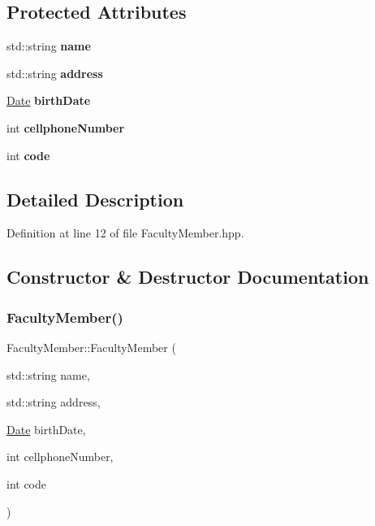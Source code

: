 \subsection*{Protected Attributes}
\begin{DoxyCompactItemize}
\item 
\mbox{\label{classFacultyMember_a1db0d896f97f2ef4e38aa84bf6720f9e}} 
std\+::string {\bfseries name}
\item 
\mbox{\label{classFacultyMember_adaecb566a4413d65f3ff4b9ba0048fc7}} 
std\+::string {\bfseries address}
\item 
\mbox{\label{classFacultyMember_ac859efad6315ad7a295728d8db4d85f3}} 
\hyperlink{classDate}{Date} {\bfseries birth\+Date}
\item 
\mbox{\label{classFacultyMember_a599fa2364bdb3e9365c3cf2f678f028a}} 
int {\bfseries cellphone\+Number}
\item 
\mbox{\label{classFacultyMember_a925536a617e1222236daf8e96864b1f2}} 
int {\bfseries code}
\end{DoxyCompactItemize}


\subsection{Detailed Description}


Definition at line 12 of file Faculty\+Member.\+hpp.



\subsection{Constructor \& Destructor Documentation}
\mbox{\label{classFacultyMember_a02d3bfb88e071e17053309606544ca29}} 
\subsubsection{\texorpdfstring{Faculty\+Member()}{FacultyMember()}}
{\footnotesize\ttfamily Faculty\+Member\+::\+Faculty\+Member (\begin{DoxyParamCaption}\item[{std\+::string}]{name,  }\item[{std\+::string}]{address,  }\item[{\hyperlink{classDate}{Date}}]{birth\+Date,  }\item[{int}]{cellphone\+Number,  }\item[{int}]{code }\end{DoxyParamCaption})}

